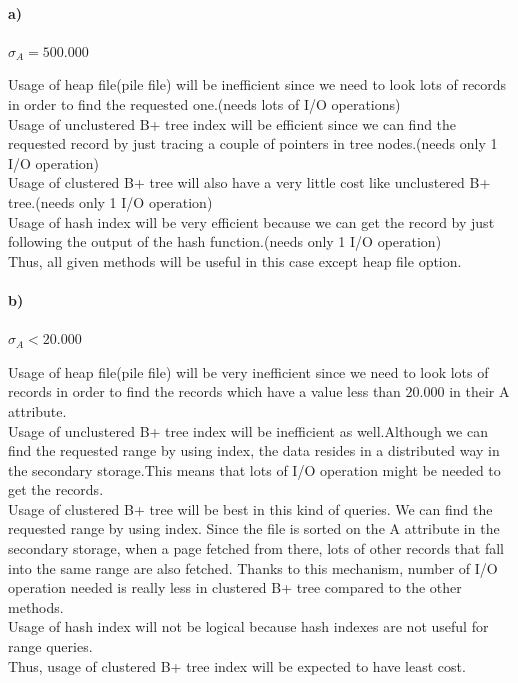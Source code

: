 \documentclass[a4paper,12pt]{article}
\begin{document}
\paragraph{a)}  $\sigma_A=500.000$

\begin{tcolorbox}
Usage of heap file(pile file) will be inefficient since we need to look lots of records in order to find the requested one.(needs lots of I/O operations) \\
Usage of unclustered B+ tree index will be efficient since we can find the requested record by just tracing a couple of pointers in tree nodes.(needs only 1 I/O operation) \\
Usage of clustered B+ tree will also have a very little cost like unclustered B+ tree.(needs only 1 I/O operation) \\
Usage of hash index will be very efficient because we can get the record by just following the output of the hash function.(needs only 1 I/O operation)\\
Thus, all given methods will be useful in this case except heap file option.
\end{tcolorbox}

\paragraph{b)}$\sigma_A<20.000$

\begin{tcolorbox}
Usage of heap file(pile file) will be very inefficient since we need to look lots of records in order to find the records which have a value less than $20.000$ in their A attribute.\\
Usage of unclustered B+ tree index will be inefficient as well.Although we can find the requested range by using index, the data resides in a distributed way in the secondary storage.This means that lots of I/O operation might be needed to get the records. \\
Usage of clustered B+ tree will be best in this kind of queries. We can find the requested range by using index. Since the file is sorted on the A attribute in the secondary storage, when a page fetched from there, lots of other records that fall into the same range are also fetched. Thanks to this mechanism, number of I/O operation needed is really less in clustered B+ tree compared to the other methods.\\
Usage of hash index will not be logical because hash indexes are not useful for range queries.\\
Thus, usage of clustered B+ tree index will be expected to have least cost.
\end{tcolorbox}
\end{document}
